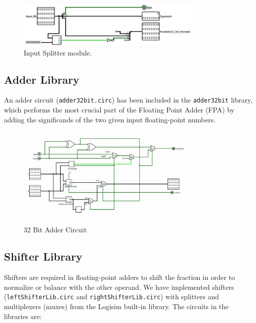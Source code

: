 \documentclass{article}
\begin{document}
\begin{figure}[h!]
\centering
\includegraphics[width=0.8\textwidth]{Input_splitter.jpg} %
\caption{Input Splitter module.}
\label{fig:input_splitter}
\end{figure}


\subsection{Adder Library}

An adder circuit (\texttt{adder32bit.circ}) has been included in the \texttt{adder32bit} library, which performs the most crucial part of the Floating Point Adder (FPA) by adding the significands of the two given input floating-point numbers.

\begin{figure}[H]
    \centering
    \includegraphics[width=0.8\textwidth]{32bit_adder_circuit.png} %
    \caption{32 Bit Adder Circuit}
    \label{fig:32bit_adder}
\end{figure}


\subsection{ Shifter Library}

Shifters are required in floating-point adders to shift the fraction in order to normalize or balance with the other operand. We have implemented shifters (\texttt{leftShifterLib.circ} and \texttt{rightShifterLib.circ}) with splitters and multiplexers (muxes) from the Logisim built-in library. The circuits in the libraries are:
\end{document}
